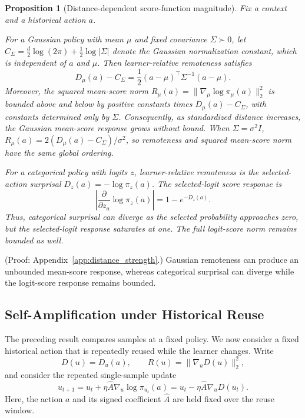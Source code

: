 \documentclass{article}
\theoremstyle{plain}
\newtheorem{proposition}[theorem]{Proposition}
\theoremstyle{definition}
\theoremstyle{remark}
\begin{document}
\begin{proposition}[Distance-dependent score-function magnitude]
\label{prop:distance_strength}
Fix a context and a historical action \(a\).

For a Gaussian policy with mean \(\mu\) and fixed covariance
\(\Sigma\succ0\), let
\(C_\Sigma=\frac{d}{2}\log(2\pi)+\frac12\log|\Sigma|\) denote the
Gaussian normalization constant, which is independent of \(a\) and
\(\mu\). Then learner-relative remoteness satisfies
\begin{equation}
    D_\mu(a)-C_\Sigma
    =
    \frac12
    (a-\mu)^\top\Sigma^{-1}(a-\mu).
    \label{eq:gaussian_remoteness_mahalanobis}
\end{equation}
Moreover, the squared mean-score norm
\(R_\mu(a)=\|\nabla_\mu\log\pi_\mu(a)\|_2^2\) is bounded above and below
by positive constants times \(D_\mu(a)-C_\Sigma\), with constants
determined only by \(\Sigma\). Consequently, as standardized distance
increases, the Gaussian mean-score response grows without bound. When
\(\Sigma=\sigma^2I\), \(R_\mu(a)=2(D_\mu(a)-C_\Sigma)/\sigma^2\), so
remoteness and squared mean-score norm have the same global ordering.

For a categorical policy with logits \(z\), learner-relative remoteness is
the selected-action surprisal \(D_z(a)=-\log\pi_z(a)\). The selected-logit
score response is
\begin{equation}
    \left|
    \frac{\partial}{\partial z_a}
    \log \pi_z(a)
    \right|
    =
    1-e^{-D_z(a)}.
    \label{eq:categorical_selected_score}
\end{equation}
Thus, categorical surprisal can diverge as the selected probability
approaches zero, but the selected-logit response saturates at one. The
full logit-score norm remains bounded as well.
\end{proposition}

(Proof: Appendix~\ref{app:distance_strength}.) Gaussian remoteness can
produce an unbounded mean-score response, whereas categorical surprisal can
diverge while the logit-score response remains bounded.


\subsection{Self-Amplification under Historical Reuse}
\label{sec:self_amplification}

The preceding result compares samples at a fixed policy. We now consider
a fixed historical action that is repeatedly reused while the learner
changes. Write
\[
    D(u)=D_u(a),
    \qquad
    R(u)=\|\nabla_uD(u)\|_2^2,
\]
and consider the repeated single-sample update
\begin{equation}
    u_{t+1}
    =
    u_t
    +
    \eta\widehat A\nabla_u\log\pi_{u_t}(a)
    =
    u_t
    -
    \eta\widehat A\nabla_uD(u_t).
    \label{eq:single_sample_reuse_update}
\end{equation}
Here, the action \(a\) and its signed coefficient \(\widehat A\) are
held fixed over the reuse window.
\end{document}
